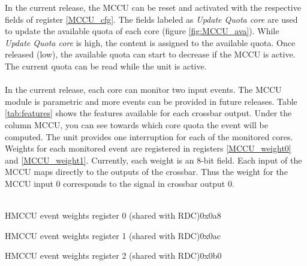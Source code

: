 In the current release, the MCCU can be reset and activated with the respective fields of register \ref{MCCU_cfg}. The fields labeled as \textit{Update Quota core} are used to update the available quota of each core (figure \ref{fig:MCCU_ava}). While  \textit{Update Quota core} is high, the content is assigned to the available quota. Once released (low), the available quota can start to decrease if the MCCU is active. The current quota can be read while the unit is active.\\
\\
In the current release, each core can monitor two input events. The MCCU module is parametric and more events can be provided in future releases.  Table \ref{tab:features} shows the features available for each crossbar output. Under the column MCCU, you can see towards which core quota the event will be computed.
The unit provides one interruption for each of the monitored cores. 
\\
Weights for each monitored event are registered in registers \ref{MCCU_weight0} and \ref{MCCU_weight1}. Currently, each weight is an 8-bit field. Each input of the MCCU maps directly to the outputs of the crossbar. Thus the weight for the MCCU input 0 corresponds to the signal in crossbar output 0.\\
\\
\begin{register}{H}{MCCU event weights register 0 (shared with RDC)}{0x0a8}
	\label{MCCU_weight0}
	\regnewline
\end{register}
\begin{register}{H}{MCCU event weights register 1 (shared with RDC)}{0x0ac}
	\label{MCCU_weight1}
	\regnewline
\end{register}
\begin{register}{H}{MCCU event weights register 2 (shared with RDC)}{0x0b0}
	\label{MCCU_weight1}
	\regnewline
\end{register}


